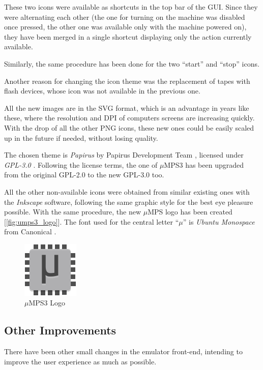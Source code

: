 \documentclass[12pt,a4paper,openright,twoside]{report}
\begin{document}
These two icons were available as shortcuts in the top bar of the GUI.
Since they were alternating each other (the one for turning on the machine was disabled once pressed, the other one was available only with the machine powered on), they have been merged in a single shortcut displaying only the action currently available.

Similarly, the same procedure has been done for the two ``start'' and ``stop'' icons.

Another reason for changing the icon theme was the replacement of tapes with flash devices, whose icon was not available in the previous one.

All the new images are in the SVG format, which is an advantage in years like these, where the resolution and DPI of computers screens are increasing quickly.
With the drop of all the other PNG icons, these new ones could be easily scaled up in the future if needed, without losing quality.

The chosen theme is \textit{Papirus} by Papirus Development Team \cite{papirus}, licensed under \textit{GPL-3.0} \cite{gpl3}.
Following the license terms, the one of $\mu$MPS3 has been upgraded from the original GPL-2.0 to the new GPL-3.0 too.

All the other non-available icons were obtained from similar existing ones with the \textit{Inkscape} \cite{inkscape} software, following the same graphic style for the best eye pleasure possible.
With the same procedure, the new $\mu$MPS logo has been created [\autoref{fig:umps3_logo}].
The font used for the central letter ``$\mu$'' is \textit{Ubuntu Monospace} from Canonical \cite{ubuntu_mono}.
\begin{figure}[h]
	\centering
	\includegraphics[scale=2]{umps3}
	\caption{$\mu$MPS3 Logo}
	\label{fig:umps3_logo}
\end{figure}

\subsection{Other Improvements}
There have been other small changes in the emulator front-end, intending to improve the user experience as much as possible.
\end{document}

